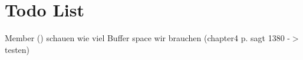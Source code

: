 \chapter{Todo List}
\hypertarget{todo}{}\label{todo}

\begin{DoxyRefList}
\item[Member \doxylink{class_socket_client_ae3962f762b411e9b4bf06be013c3c9f1}{Socket\+Client\+::establish\+Lan\+Connection} ()]\label{todo__todo000004}%
%
schauen wie viel Buffer space wir brauchen (chapter4 p. sagt 1380 -\/\texorpdfstring{$>$}{>}testen) 
\end{DoxyRefList}